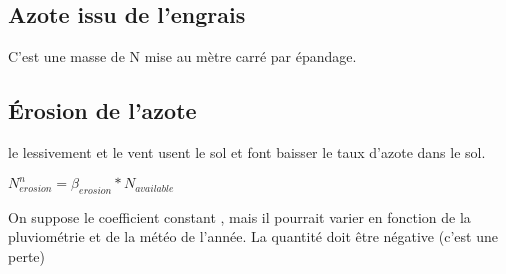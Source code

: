 \documentclass[10pt,a4paper,french]{article} %
\begin{document}
\subsection{Azote issu de l'engrais}


C'est une masse de N mise au mètre carré par épandage.


\subsection{Érosion de l'azote}

le lessivement et  le vent usent le sol et font baisser le taux d'azote dans le sol. 

$N_{erosion}^n = \beta_{erosion}* N_{available}$


On suppose le coefficient constant , mais il pourrait varier en fonction de la pluviométrie et de la météo de l'année.
La quantité doit être négative (c'est une perte) 
\end{document}
